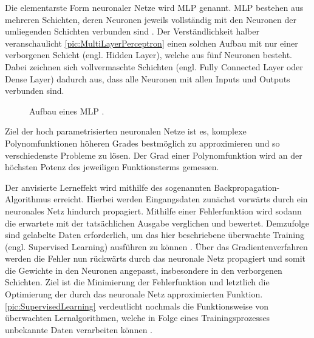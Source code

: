 \noindent
Die elementarste Form neuronaler Netze wird \ac{MLP} genannt. \ac{MLP} bestehen aus mehreren Schichten, deren Neuronen jeweils vollständig mit den Neuronen der umliegenden Schichten verbunden sind \cite[S.~131]{ZHA20}. Der Verständlichkeit halber veranschaulicht \autoref{pic:MultiLayerPerceptron} einen solchen Aufbau mit nur einer verborgenen Schicht (engl. Hidden Layer), welche aus fünf Neuronen besteht. Dabei zeichnen sich vollvermaschte Schichten (engl. Fully Connected Layer oder Dense Layer) dadurch aus, dass alle Neuronen mit allen Inputs und Outputs verbunden sind.\\

\begin{figure}[h!]
  \centering
  \caption{Aufbau eines MLP \cite[S.~388]{RAS19}.}
  \label{pic:MultiLayerPerceptron}
\end{figure}

\noindent
Ziel der hoch parametrisierten neuronalen Netze ist es, komplexe Polynomfunktionen höheren Grades bestmöglich zu approximieren und so verschiedenste Probleme zu lösen. Der Grad einer Polynomfunktion wird an der höchsten Potenz des jeweiligen Funktionsterms gemessen.
\newpage

\noindent
Der anvisierte Lerneffekt wird mithilfe des sogenannten Backpropagation-Algorithmus erreicht. Hierbei werden Eingangsdaten zunächst vorwärts durch ein neuronales Netz hindurch propagiert. Mithilfe einer Fehlerfunktion wird sodann die erwartete mit der tatsächlichen Ausgabe verglichen und bewertet. Demzufolge sind gelabelte Daten erforderlich, um das hier beschriebene überwachte Training (engl. Supervised Learning) ausführen zu können \cite[S.~3]{RAS19}. Über das Gradientenverfahren werden die Fehler nun rückwärts durch das neuronale Netz propagiert und somit die Gewichte in den Neuronen angepasst, insbesondere in den verborgenen Schichten. Ziel ist die Minimierung der Fehlerfunktion und letztlich die Optimierung der durch das neuronale Netz approximierten Funktion. \autoref{pic:SupervisedLearning} verdeutlicht nochmals die Funktionsweise von überwachten Lernalgorithmen, welche in Folge eines Trainingsprozesses unbekannte Daten verarbeiten können \cite[S.~167-169]{ZHA20}.\\

